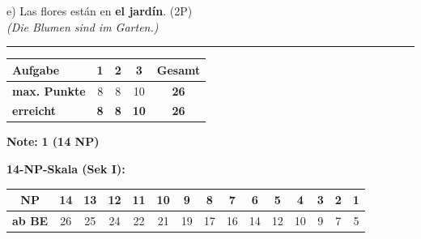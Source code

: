 \documentclass[11pt, a4paper]{article}
\newcommand{\lsg}[1]{\textcolor{loesung}{\textbf{#1}}}
\begin{document}
\vspace{0.8em}

\noindent
e) Las flores están en \lsg{el jardín}. \hfill (2P) \\
\hspace*{0.5cm}\textit{(Die Blumen sind im Garten.)}


\vspace{25pt}
\hrule
\vspace{10pt}

\noindent
\begin{tabularx}{\textwidth}{|X|c|c|c||c|}
\hline
\textbf{Aufgabe} & 1 & 2 & 3 & \textbf{Gesamt} \\
\hline
\textbf{max. Punkte} & 8 & 8 & 10 & \textbf{26} \\
\hline
\textbf{erreicht} & \lsg{8} & \lsg{8} & \lsg{10} & \lsg{26} \\
\hline
\end{tabularx}

\vspace{10pt}

\begin{flushright}
\textbf{Note:} \lsg{1 (14 NP)}
\end{flushright}

\vspace{1em}

\textbf{14-NP-Skala (Sek I):}

\begin{tabular}{|c|c|c|c|c|c|c|c|c|c|c|c|c|c|c|}
\hline
\textbf{NP} & 14 & 13 & 12 & 11 & 10 & 9 & 8 & 7 & 6 & 5 & 4 & 3 & 2 & 1 \\
\hline
\textbf{ab BE} & 26 & 25 & 24 & 22 & 21 & 19 & 17 & 16 & 14 & 12 & 10 & 9 & 7 & 5 \\
\hline
\end{tabular}
\end{document}
